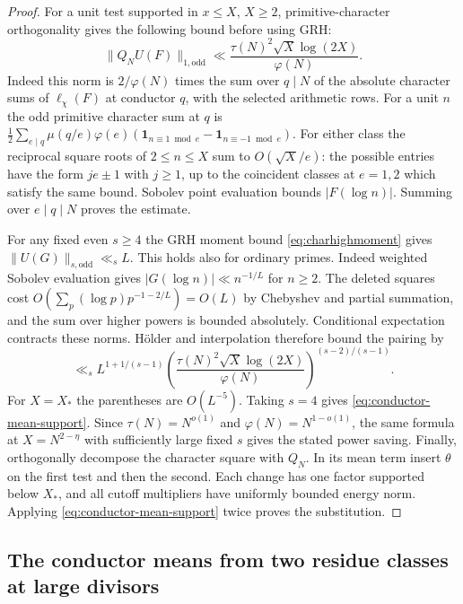 \documentclass[11pt,a4paper]{article}
\numberwithin{equation}{section}
\begin{document}
\begin{proof}
For a unit test supported in $x\le X$, $X\ge2$, primitive-character
orthogonality gives the following bound before using GRH:
\[
 \|Q_NU(F)\|_{1,\mathrm{odd}}
 \ll \frac{\tau(N)^2\sqrt X\log(2X)}{\varphi(N)} .
\]
Indeed this norm is $2/\varphi(N)$ times the sum over $q\mid N$
of the absolute character sums of $\ell_\chi(F)$ at conductor $q$,
with the selected arithmetic rows. For a unit $n$ the odd primitive
character sum at $q$ is
$\tfrac12\sum_{e\mid q}\mu(q/e)\varphi(e)
(\mathbf1_{n\equiv1\bmod e}-\mathbf1_{n\equiv-1\bmod e})$.
For either class the reciprocal square roots of $2\le n\le X$ sum
to $O(\sqrt X/e)$: the possible entries have the form $je\pm1$
with $j\ge1$, up to the coincident classes at $e=1,2$ which satisfy
the same bound. Sobolev point evaluation bounds $|F(\log n)|$.
Summing over $e\mid q\mid N$ proves the estimate.

For any fixed even $s\ge4$ the GRH moment bound \eqref{eq:charhighmoment}
gives $\|U(G)\|_{s,\mathrm{odd}}\ll_s L$. This holds also for
ordinary primes. Indeed weighted Sobolev evaluation gives
$|G(\log n)|\ll n^{-1/L}$ for $n\ge2$. The deleted squares cost
$O(\sum_p(\log p)p^{-1-2/L})=O(L)$ by Chebyshev and partial
summation, and the sum over higher powers is bounded absolutely.
Conditional expectation contracts these norms. H\"older and
interpolation therefore bound the pairing by
\[
 \ll_s L^{1+1/(s-1)}
  \left(\frac{\tau(N)^2\sqrt X\log(2X)}{\varphi(N)}
       \right)^{(s-2)/(s-1)} .
\]
For $X=X_*$ the parentheses are $O(L^{-5})$. Taking $s=4$
gives \eqref{eq:conductor-mean-support}. Since $\tau(N)=N^{o(1)}$
and $\varphi(N)=N^{1-o(1)}$, the same formula at $X=N^{2-\eta}$
with sufficiently large fixed $s$ gives the stated power saving.
Finally, orthogonally decompose the character square with $Q_N$.
In its mean term insert $\theta$ on the first test and then the
second. Each change has one factor supported below $X_*$, and all
cutoff multipliers have uniformly bounded energy norm. Applying
\eqref{eq:conductor-mean-support} twice proves the substitution.
\end{proof}

\subsection{The conductor means from two residue classes at large divisors}
\end{document}
